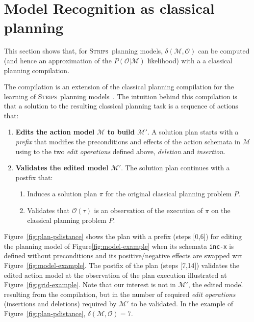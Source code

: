 \documentclass[letterpaper]{article} %
\newcommand{\strips}{\textsc{Strips}}     %
\begin{document}
\section{Model Recognition as classical planning}
This section shows that, for \strips\ planning models, $\delta(\mathcal{M},\mathcal{O})$ can be computed (and hence an approximation of the $P(\mathcal{O}|\mathcal{M})$ likelihood) with a a classical planning compilation.

The compilation is an extension of the classical planning compilation for the learning of \strips\ planning models~\cite{aineto2018learning}. The intuition behind this compilation is that a solution to the resulting classical planning task is a sequence of actions that:
\begin{enumerate}
\item {\bf Edits the action model $\mathcal{M}$ to build $\mathcal{M}'$}. A solution plan starts with a {\em prefix} that modifies the preconditions and effects of the action schemata in $\mathcal{M}$ using to the two {\em edit operations} defined above, {\em deletion} and {\em insertion}. 
\item {\bf Validates the edited model $\mathcal{M}'$}. The solution plan continues with a postfix that:
\begin{enumerate}
\item Induces a solution plan $\pi$ for the original classical planning problem $P$.
\item Validates that $\mathcal{O}(\tau)$ is an observation of the execution of $\pi$ on the classical planning problem $P$.
\end{enumerate}
\end{enumerate}

Figure~\ref{fig:plan-pdistance} shows the plan with a prefix (steps [0,6]) for editing the planning model of Figure\ref{fig:model-example} when its schemata {\tt\small inc-x} is defined without preconditions and its positive/negative effects are swapped wrt Figure~\ref{fig:model-example}. The postfix of the plan (steps [7,14]) validates the edited action model at the observation of the plan execution illustrated at Figure~\ref{fig:grid-example}. Note that our interest is not in $\mathcal{M}'$, the edited model resulting from the compilation, but in the number of required {\em edit operations} (insertions and deletions) required by $\mathcal{M}'$ to be validated. In the example of Figure~\ref{fig:plan-pdistance}, $\delta(\mathcal{M},\mathcal{O})=7$.
\end{document}
